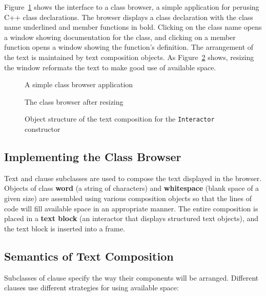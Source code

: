Figure~\ref{text1} shows the interface to a class browser, a simple
application for perusing C++ class declarations.  The browser displays
a class declaration with the class name underlined and member
functions in bold.
Clicking on the class name opens a window showing documentation
for the class, and clicking on a member function opens a window
showing the function's definition.  The arrangement of the text is
maintained by text composition objects.  As Figure~\ref{text2} shows,
resizing the window reformats the text to make good use of available
space.

\begin{figure}[p]
\vspace{2.25in}
\caption{A simple class browser application}
\label{text1}
\end{figure}

\begin{figure}[p]
\vspace{2.25in}
\caption{The class browser after resizing}
\label{text2}
\end{figure}

\begin{figure}[p]
\vspace{1.25in}
\vspace{1ex}
\caption{Object structure of the text composition for the 
    {\tt Interactor} constructor}
\label{text:schematic}
\end{figure}

    \subsection{Implementing the Class \newline Browser}

Text and clause subclasses are used to compose the text displayed in
the browser.  Objects of class {\bf word} (a string of characters) and {\bf
whitespace} (blank space of a given size) are assembled
using various composition objects so that the lines of code will fill
available space in an appropriate manner.  The entire composition is placed
in a {\bf text block} (an interactor that displays structured text objects),
and the text block is inserted into a frame.

    \subsection{Semantics of Text Composition}
Subclasses of clause specify the way their components will be arranged.
Different clauses use different
strategies for using available space:

